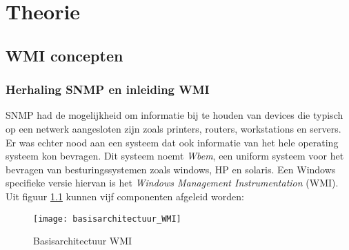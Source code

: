 \documentclass{report}
\begin{document}

	\tableofcontents

	\part{Theorie}
	\chapter{WMI concepten}
	\section{Herhaling SNMP en inleiding WMI}
	SNMP had de mogelijkheid om informatie bij te houden van devices die typisch op een netwerk aangesloten zijn zoals printers, routers, workstations en servers. Er was echter nood aan een systeem dat ook informatie van het hele operating systeem kon bevragen.
	Dit systeem noemt \textit{Wbem}, een uniform systeem voor het bevragen van besturingssystemen zoals windows, HP en solaris. Een Windows specifieke versie hiervan is het \textit{Windows Management Instrumentation} (WMI). Uit figuur \ref{fig:basisarchitectuur_WMI} kunnen vijf componenten afgeleid worden:
	\begin{figure}[h]
		\centering
		\texttt{[image: basisarchitectuur\_WMI]}
		\caption{Basisarchitectuur WMI}
		\label{fig:basisarchitectuur_WMI}
	\end{figure}
\end{document}
